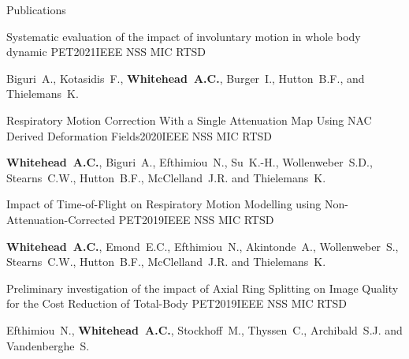 \documentclass{cv}
\begin{document}
\begin{rSection}{Publications}
        \begin{rSubsection}{Systematic evaluation of the impact of involuntary motion in whole body dynamic PET}{2021}{IEEE NSS MIC RTSD}{}
            \item Biguri~A., Kotasidis~F., {\bf Whitehead~A.C.}, Burger~I., Hutton~B.F., and Thielemans~K.
        \end{rSubsection}
        
        \begin{rSubsection}{Respiratory Motion Correction With a Single Attenuation Map Using NAC Derived Deformation Fields}{2020}{IEEE NSS MIC RTSD}{}
            \item {\bf Whitehead~A.C.}, Biguri~A., Efthimiou~N., Su~K.-H., Wollenweber~S.D., Stearns~C.W., Hutton~B.F., McClelland~J.R. and Thielemans~K.
        \end{rSubsection}
        
        \begin{rSubsection}{Impact of Time-of-Flight on Respiratory Motion Modelling using Non-Attenuation-Corrected \newline PET}{2019}{IEEE NSS MIC RTSD}{}
            \item {\bf Whitehead~A.C.}, Emond~E.C., Efthimiou~N., Akintonde~A., Wollenweber~S., Stearns~C.W., Hutton~B.F., McClelland~J.R. and Thielemans~K.
        \end{rSubsection}
        
        \begin{rSubsection}{Preliminary investigation of the impact of Axial Ring Splitting on Image Quality for the Cost Reduction of Total-Body PET}{2019}{IEEE NSS MIC RTSD}{}
            \item Efthimiou~N., {\bf Whitehead~A.C.}, Stockhoff~M., Thyssen~C., Archibald~S.J. and Vandenberghe~S.
        \end{rSubsection}
    \end{rSection}
    
\end{document}
